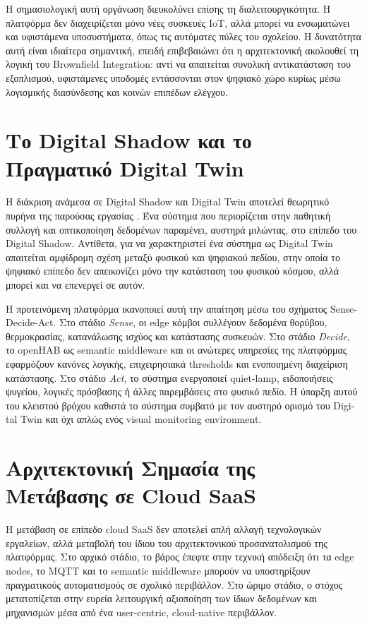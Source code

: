 Η σημασιολογική αυτή οργάνωση διευκολύνει επίσης τη διαλειτουργικότητα. Η πλατφόρμα δεν διαχειρίζεται μόνο νέες συσκευές \textlatin{IoT}, αλλά μπορεί να ενσωματώνει και υφιστάμενα υποσυστήματα, όπως τις αυτόματες πύλες του σχολείου. Η δυνατότητα αυτή είναι ιδιαίτερα σημαντική, επειδή επιβεβαιώνει ότι η αρχιτεκτονική ακολουθεί τη λογική του \textlatin{Brownfield Integration}: αντί να απαιτείται συνολική αντικατάσταση του εξοπλισμού, υφιστάμενες υποδομές εντάσσονται στον ψηφιακό χώρο κυρίως μέσω λογισμικής διασύνδεσης και κοινών επιπέδων ελέγχου.

\section{Το Digital Shadow και το Πραγματικό Digital Twin}
Η διάκριση ανάμεσα σε \textlatin{Digital Shadow} και \textlatin{Digital Twin} αποτελεί θεωρητικό πυρήνα της παρούσας εργασίας \cite{Kritzinger2018}. Ένα σύστημα που περιορίζεται στην παθητική συλλογή και οπτικοποίηση δεδομένων παραμένει, αυστηρά μιλώντας, στο επίπεδο του \textlatin{Digital Shadow}. Αντίθετα, για να χαρακτηριστεί ένα σύστημα ως \textlatin{Digital Twin} απαιτείται αμφίδρομη σχέση μεταξύ φυσικού και ψηφιακού πεδίου, στην οποία το ψηφιακό επίπεδο δεν απεικονίζει μόνο την κατάσταση του φυσικού κόσμου, αλλά μπορεί και να επενεργεί σε αυτόν.

Η προτεινόμενη πλατφόρμα ικανοποιεί αυτή την απαίτηση μέσω του σχήματος \textlatin{Sense-Decide-Act}. Στο στάδιο \textit{\textlatin{Sense}}, οι \textlatin{edge} κόμβοι συλλέγουν δεδομένα θορύβου, θερμοκρασίας, κατανάλωσης ισχύος και κατάστασης συσκευών. Στο στάδιο \textit{\textlatin{Decide}}, το \textlatin{openHAB} ως \textlatin{semantic middleware} και οι ανώτερες υπηρεσίες της πλατφόρμας εφαρμόζουν κανόνες λογικής, επιχειρησιακά \textlatin{thresholds} και ενοποιημένη διαχείριση κατάστασης. Στο στάδιο \textit{\textlatin{Act}}, το σύστημα ενεργοποιεί \textlatin{quiet-lamp}, ειδοποιήσεις ψυγείου, λογικές πρόσβασης ή άλλες παρεμβάσεις στο φυσικό πεδίο. Η ύπαρξη αυτού του κλειστού βρόχου καθιστά το σύστημα συμβατό με τον αυστηρό ορισμό του \textlatin{Digital Twin} και όχι απλώς ενός \textlatin{visual monitoring environment}.

\section{Αρχιτεκτονική Σημασία της Μετάβασης σε Cloud SaaS}
Η μετάβαση σε επίπεδο \textlatin{cloud SaaS} δεν αποτελεί απλή αλλαγή τεχνολογικών εργαλείων, αλλά μεταβολή του ίδιου του αρχιτεκτονικού προσανατολισμού της πλατφόρμας. Στο αρχικό στάδιο, το βάρος έπεφτε στην τεχνική απόδειξη ότι τα \textlatin{edge nodes}, το \textlatin{MQTT} και το \textlatin{semantic middleware} μπορούν να υποστηρίξουν πραγματικούς αυτοματισμούς σε σχολικό περιβάλλον. Στο ώριμο στάδιο, ο στόχος μετατοπίζεται στην ευρεία λειτουργική αξιοποίηση των ίδιων δεδομένων και μηχανισμών μέσα από ένα \textlatin{user-centric}, \textlatin{cloud-native} περιβάλλον.

